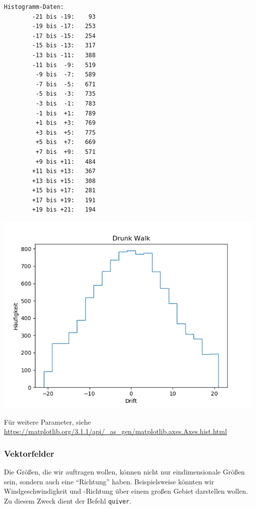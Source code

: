 \begin{tcbraster}[raster columns=2,
                  raster equal height,
                  nobeforeafter,
                  raster column skip=0.5cm]
\begin{cmdbox}
\begin{verbatim}
Histogramm-Daten:
        -21 bis -19:    93
        -19 bis -17:   253
        -17 bis -15:   254
        -15 bis -13:   317
        -13 bis -11:   388
        -11 bis  -9:   519
         -9 bis  -7:   589
         -7 bis  -5:   671
         -5 bis  -3:   735
         -3 bis  -1:   783
         -1 bis  +1:   789
         +1 bis  +3:   769
         +3 bis  +5:   775
         +5 bis  +7:   669
         +7 bis  +9:   571
         +9 bis +11:   484
        +11 bis +13:   367
        +13 bis +15:   308
        +15 bis +17:   281
        +17 bis +19:   191
        +19 bis +21:   194
\end{verbatim}
\end{cmdbox}
%
\begin{tcolorbox}[title=Plot: Drunk Walk als Histogramm]
	\includegraphics[width=\linewidth]{./gfx/plt-hist-drunkWalk}
\end{tcolorbox}
\end{tcbraster}

Für weitere Parameter, siehe \url{https://matplotlib.org/3.1.1/api/_as_gen/matplotlib.axes.Axes.hist.html}

\subsubsection{Vektorfelder}
Die Größen, die wir auftragen wollen, können nicht nur eindimensionale Größen sein, sondern auch eine \enquote{Richtung} haben. Beispielsweise könnten wir Windgeschwindigkeit und -Richtung über einem großen Gebiet darstellen wollen. Zu diesem Zweck dient der Befehl \texttt{quiver}. 

